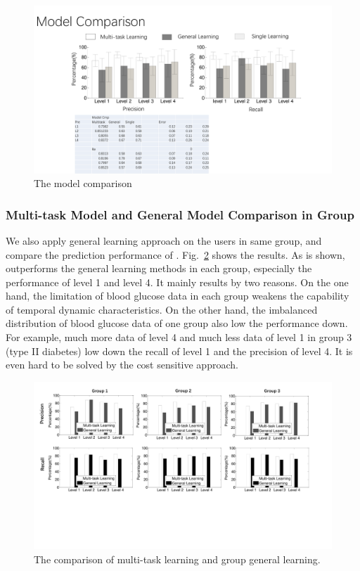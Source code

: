 \begin{figure}[!t]
\centering
\includegraphics[width=0.9\columnwidth]{./img/CMP_Models.pdf}
\caption{The model comparison}
\label{fig:cmp_model}
\end{figure}


\subsubsection{Multi-task Model and General Model Comparison in Group}
We also apply general learning approach on the users in same group, and compare the prediction performance of \modelname. Fig.~\ref{fig:cmp_groups}
shows the results. As is shown, \modelname outperforms the general learning methods in each group, especially the performance of level 1 and level 4. It mainly results by two reasons. On the one hand, the limitation of blood glucose data in each group weakens the capability of temporal dynamic characteristics. On the other hand, the imbalanced distribution of blood glucose data of one group also low the performance down. For example, much more data of level 4 and much less data of level 1 in group 3 (type II diabetes) low down the recall of level 1 and the precision of level 4. It is even hard to be solved by the cost sensitive approach. 


\begin{figure}[!t]
\centering
\includegraphics[width=0.9\columnwidth]{./img/group_multi_task.pdf}
\caption{The comparison of multi-task learning and group general learning.}
\label{fig:cmp_groups}
\end{figure}


